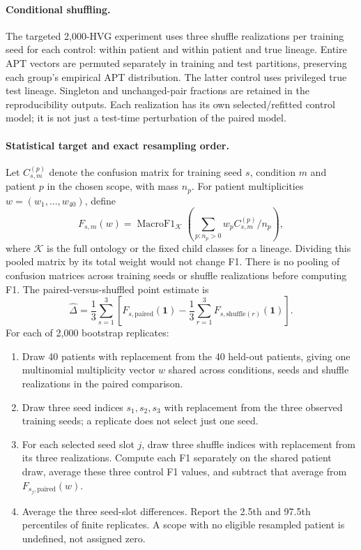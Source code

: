 \paragraph{Conditional shuffling.}
The targeted 2,000-HVG experiment uses three shuffle realizations per
training seed for each control: within patient and within patient and true
lineage. Entire APT vectors are permuted separately in training and test
partitions, preserving each group's empirical APT distribution. The latter
control uses privileged true test lineage. Singleton and unchanged-pair
fractions are retained in the reproducibility outputs. Each realization
has its own selected/refitted control model; it is not just a test-time
perturbation of the paired model.

\paragraph{Statistical target and exact resampling order.}
Let $C_{s,m}^{(p)}$ denote the confusion matrix for training seed $s$,
condition $m$ and patient $p$ in the chosen scope, with mass $n_p$.
For patient multiplicities $w=(w_1,\ldots,w_{40})$, define
\[
 F_{s,m}(w)=\operatorname{MacroF1}_{\mathcal K}
 \left(\sum_{p:n_p>0} w_p C_{s,m}^{(p)}/n_p\right),
\]
where $\mathcal K$ is the full ontology or the fixed child classes for a
lineage. Dividing this pooled matrix by its total weight would not change
F1. There is no pooling of confusion matrices across training seeds or
shuffle realizations before computing F1. The paired-versus-shuffled
point estimate is
\[
 \widehat\Delta=\frac13\sum_{s=1}^{3}
 \left[F_{s,\mathrm{paired}}(\mathbf 1)
       -\frac13\sum_{r=1}^{3}F_{s,\mathrm{shuffle}(r)}(\mathbf 1)\right].
\]
For each of 2,000 bootstrap replicates:
\begin{enumerate}
\item Draw 40 patients with replacement from the 40 held-out patients,
giving one multinomial multiplicity vector $w$ shared across conditions,
seeds and shuffle realizations in the paired comparison.
\item Draw three seed indices $s_1,s_2,s_3$ with replacement from the three
observed training seeds; a replicate does not select just one seed.
\item For each selected seed slot $j$, draw three shuffle indices with
replacement from its three realizations. Compute each F1 separately on
the shared patient draw, average these three control F1 values, and subtract
that average from $F_{s_j,\mathrm{paired}}(w)$.
\item Average the three seed-slot differences. Report the 2.5th and 97.5th
percentiles of finite replicates. A scope with no eligible resampled patient
is undefined, not assigned zero.
\end{enumerate}
